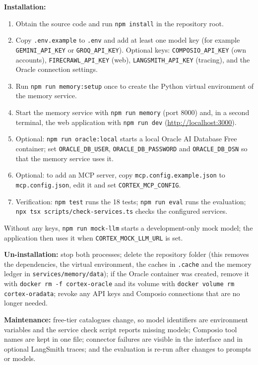 \documentclass[oneside,a4paper,12pt]{report}
\begin{document}
\textbf{Installation:}
\begin{enumerate}
\item Obtain the source code and run \texttt{npm install} in the repository root.
\item Copy \texttt{.env.example} to \texttt{.env} and add at least one model key (for example \texttt{GEMINI\_API\_KEY} or \texttt{GROQ\_API\_KEY}). Optional keys: \texttt{COMPOSIO\_API\_KEY} (own accounts), \texttt{FIRECRAWL\_API\_KEY} (web), \texttt{LANGSMITH\_API\_KEY} (tracing), and the Oracle connection settings.
\item Run \texttt{npm run memory:setup} once to create the Python virtual environment of the memory service.
\item Start the memory service with \texttt{npm run memory} (port 8000) and, in a second terminal, the web application with \texttt{npm run dev} (\url{http://localhost:3000}).
\item Optional: \texttt{npm run oracle:local} starts a local Oracle AI Database Free container; set \texttt{ORACLE\_DB\_USER}, \texttt{ORACLE\_DB\_PASSWORD} and \texttt{ORACLE\_DB\_DSN} so that the memory service uses it.
\item Optional: to add an MCP server, copy \texttt{mcp.config.example.json} to \texttt{mcp.config.json}, edit it and set \texttt{CORTEX\_MCP\_CONFIG}.
\item Verification: \texttt{npm test} runs the 18 tests; \texttt{npm run eval} runs the evaluation; \texttt{npx tsx scripts/check-services.ts} checks the configured services.
\end{enumerate}
Without any keys, \texttt{npm run mock-llm} starts a development-only mock model; the application then uses it when \texttt{CORTEX\_MOCK\_LLM\_URL} is set.

\textbf{Un-installation:} stop both processes; delete the repository folder (this removes the dependencies, the virtual environment, the caches in \texttt{.cache} and the memory ledger in \texttt{services/memory/data}); if the Oracle container was created, remove it with \texttt{docker rm -f cortex-oracle} and its volume with \texttt{docker volume rm cortex-oradata}; revoke any API keys and Composio connections that are no longer needed.

\textbf{Maintenance:} free-tier catalogues change, so model identifiers are environment variables and the service check script reports missing models; Composio tool names are kept in one file; connector failures are visible in the interface and in optional LangSmith traces; and the evaluation is re-run after changes to prompts or models.
\end{document}
